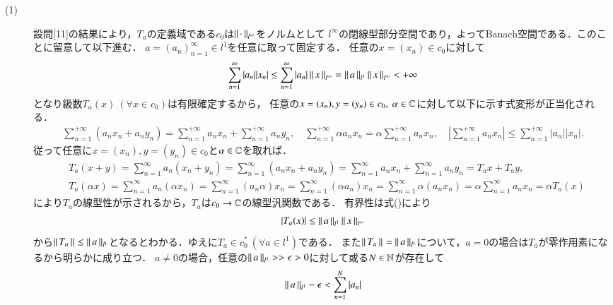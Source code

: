 \begin{prf}
\begin{description}\mbox{}
	\item[(1)] 
		設問[11]の結果により，$T_a$の定義域である$c_0$は$\left\|\, \cdot\, \right\|_{l^{\infty}}$をノルムとして
		$l^{\infty}$の閉線型部分空間であり，よってBanach空間である．このことに留意して以下進む．
		$a = (a_n)_{n=1}^{\infty} \in l^1$を任意に取って固定する．
		任意の$x=(x_n) \in c_0$に対して
		\begin{align}
			\sum_{n=1}^{\infty} |a_n| |x_n| \leq \sum_{n=1}^{\infty} |a_n| \left\|\, x\, \right\|_{l^{\infty}} = \left\|\, a\, \right\|_{l^1} \left\|\, x\, \right\|_{l^{\infty}} < +\infty
			\label{eq:func_analy_Q12}
		\end{align}
		となり級数$T_a (x)\ (\forall x \in c_0)$は有限確定するから，
		任意の$x=(x_n), y=(y_n) \in c_0,\ \alpha \in \mathbb{C}$に対して以下に示す式変形が正当化される．
		\begin{align}
			\sum_{n=1}^{+\infty} (a_n x_n + a_n y_n) = \sum_{n=1}^{+\infty} a_n x_n + \sum_{n=1}^{+\infty} a_n y_n,\quad 
			\sum_{n=1}^{+\infty} \alpha a_n x_n = \alpha \sum_{n=1}^{+\infty} a_n x_n,\quad
			\left| \sum_{n=1}^{+\infty} a_n x_n \right| \leq \sum_{n=1}^{+\infty} |a_n||x_n|.
		\end{align}
		従って任意に$x=(x_n), y=(y_n) \in c_0$と$\alpha \in \mathbb{C}$を取れば．
		\begin{align}
			&T_a(x + y) = \sum_{n=1}^{\infty}a_n (x_n + y_n) 
			= \sum_{n=1}^{\infty} (a_n x_n + a_n y_n) = \sum_{n=1}^{\infty}a_n x_n + \sum_{n=1}^{\infty}a_n y_n = T_a x + T_a y, \\
			&T_a(\alpha x) = \sum_{n=1}^{\infty}a_n(\alpha x_n) = \sum_{n=1}^{\infty}(a_n\alpha)x_n = \sum_{n=1}^{\infty}(\alpha a_n)x_n
			= \sum_{n=1}^{\infty}\alpha (a_n x_n) = \alpha \sum_{n=1}^{\infty} a_n x_n = \alpha T_a(x)
		\end{align}
		により$T_a$の線型性が示されるから，$T_a$は$c_0 \rightarrow \mathbb{C}$の線型汎関数である．
		有界性は式()により
		\begin{align}
			|T_a(x)| \leq \left\|\, a\, \right\|_{l^1} \left\|\, x\, \right\|_{l^{\infty}}
		\end{align}
		から$\left\|\, T_a\, \right\|_{} \leq \left\|\, a\, \right\|_{l^1}$となるとわかる．ゆえに$T_a \in c_0^*\ (\forall a \in l^1)$である．
		また$\left\|\, T_a\, \right\|_{} = \left\|\, a\, \right\|_{l^1}$について，$a=0$の場合は$T_a$が零作用素になるから明らかに成り立つ．
		$a \neq 0$の場合，任意の$\left\|\, a\, \right\|_{l^1} >> \epsilon >0$に対して或る$N \in \mathbb{N}$が存在して
		\begin{align}
			\left\|\, a\, \right\|_{l^1} - \epsilon < \sum_{n = 1}^{N} |a_n|
		\end{align}

\end{description}
\end{prf}
